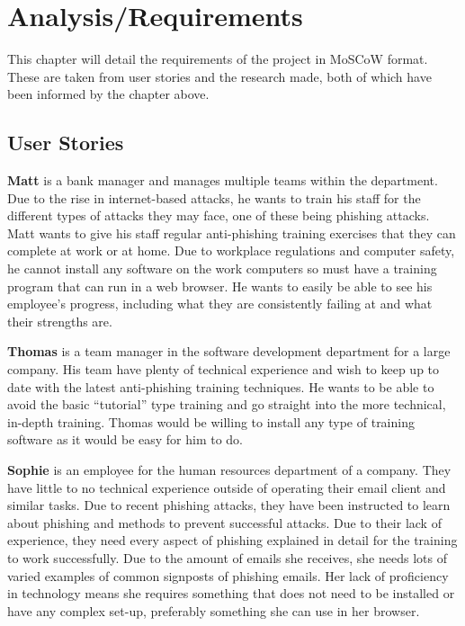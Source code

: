 \documentclass{l4proj}
\begin{document}
\chapter{Analysis/Requirements}

This chapter will detail the requirements of the project in MoSCoW format. These are taken from user stories and the research made, both of which have been informed by the chapter above.

\section{User Stories}
\textbf{Matt} is a bank manager and manages multiple teams within the department. Due to the rise in internet-based attacks, he wants to train his staff for the different types of attacks they may face, one of these being phishing attacks. Matt wants to give his staff regular anti-phishing training exercises that they can complete at work or at home. Due to workplace regulations and computer safety, he cannot install any software on the work computers so must have a training program that can run in a web browser. He wants to easily be able to see his employee's progress, including what they are consistently failing at and what their strengths are. 

\textbf{Thomas} is a team manager in the software development department for a large company. His team have plenty of technical experience and wish to keep up to date with the latest anti-phishing training techniques. He wants to be able to avoid the basic “tutorial” type training and go straight into the more technical, in-depth training. Thomas would be willing to install any type of training software as it would be easy for him to do. 

\textbf{Sophie} is an employee for the human resources department of a company. They have little to no technical experience outside of operating their email client and similar tasks. Due to recent phishing attacks, they have been instructed to learn about phishing and methods to prevent successful attacks. Due to their lack of experience, they need every aspect of phishing explained in detail for the training to work successfully. Due to the amount of emails she receives, she needs lots of varied examples of common signposts of phishing emails. Her lack of proficiency in technology means she requires something that does not need to be installed or have any complex set-up, preferably something she can use in her browser.
\end{document}
